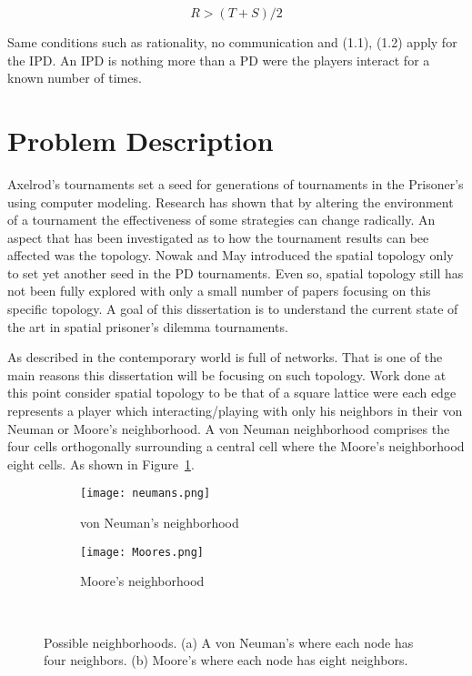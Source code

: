 \begin{equation}
    R > (T+S)/2  %
\end{equation}

Same conditions such as rationality, no communication and (1.1), (1.2) apply for
the IPD. An IPD is nothing more than a PD were the players interact for a known
number of times.

\section{Problem Description}

Axelrod's tournaments set a seed for generations of tournaments in the
Prisoner's using computer modeling. Research has shown that by altering the
environment of a tournament the effectiveness of some strategies can change
radically. An aspect that has been investigated as to how the tournament results
can bee affected was the topology. Nowak and May introduced the spatial topology
only to set yet another seed in the PD tournaments. Even so, spatial topology
still has not been fully explored with only a small number of papers focusing on
this specific topology.  A goal of this dissertation is to understand the
current state of the art in spatial prisoner’s dilemma tournaments.

As described in \cite{Maschler} the contemporary world is full of networks. That
is one of the main reasons this dissertation will be focusing on such topology.
Work done at this point consider spatial topology to be that of a square lattice
were each edge represents a player which interacting/playing with only his
neighbors in their von Neuman or Moore's neighborhood. A von Neuman neighborhood
comprises the four cells orthogonally surrounding a central cell where the
Moore's neighborhood eight cells. As shown in Figure~\ref{fig:neighborhood}.

\begin{figure}[h]
\centering
    \begin{subfigure}[t]{0.40\textwidth}
    \centering
        \texttt{[image: neumans.png]}
    \caption{von Neuman's neighborhood}
    \end{subfigure}
\hfill
    \begin{subfigure}[t]{0.40\textwidth}\centering
    \centering
        \texttt{[image: Moores.png]}
    \caption{Moore's neighborhood}
    \end{subfigure}
~
\caption{Possible neighborhoods. (a) A von Neuman's where each node has four neighbors.
(b) Moore's where each node has eight neighbors.}
\label{fig:neighborhood}
\end{figure}

